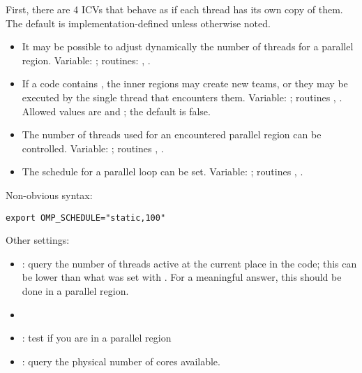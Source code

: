 First, there are 4 \acp{ICV} that behave as if each thread has its own copy of them.
The default is implementation-defined unless otherwise noted.
\begin{itemize}
  \item It may be possible to adjust dynamically the number of threads
    for a parallel region. Variable: ;
    routines: ,
    .
  \item If a code contains ,
    the inner regions may create new teams, or they may be executed by
    the single thread that encounters them. Variable:
    ; routines ,
    . Allowed values are  and
    ; the default is false.
  \item The number of threads used for an encountered parallel region
    can be controlled. Variable: ;
    routines ,
    .
  \item The schedule for a parallel loop can be set. Variable:
    ; routines
    , .
\end{itemize}

Non-obvious syntax:
\begin{verbatim}
export OMP_SCHEDULE="static,100"
\end{verbatim}

Other settings:
\begin{itemize}
\item{}: query the number of threads
  active at the current place in the code; this can be lower than what
  was set with . For a meaningful answer, this
  should be done in a parallel region.
\item{}
\item{}: test if you are in a parallel region
\item{}: query the physical number of cores available.
\end{itemize}

